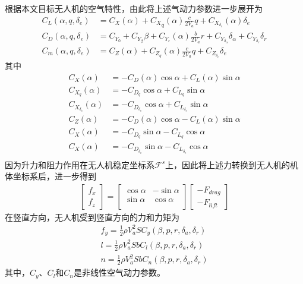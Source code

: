 根据本文目标无人机的空气特性，由此将上述气动力参数进一步展开为
\begin{align}
C_L(\alpha, q, \delta_e) &= C_X(\alpha) + {C_X}_q(\alpha) \frac{c}{2V_a}  q+ C_{X_{{\delta}_e}}(\alpha) \delta_e \\
C_D(\alpha, q, \delta_e) &= C_{Y_{0}} + C_{Y_{\beta}} \beta + C_{Y_r}(\alpha) \frac{b}{2V_a} r+ C_{Y_{\delta_\alpha}} \delta_\alpha +  C_{Y_{\delta_r}} \delta_r  \\ 
C_m(\alpha, q, \delta_e) &= C_Z(\alpha) + C_{Z_q}(\alpha) \frac{c}{2V_a}  q+ C_{Z_{\delta_e}} \delta_e
\end{align}
其中
\begin{align}
C_X(\alpha) &= -C_D(\alpha) \cos \alpha +  C_L(\alpha) \sin \alpha \\
C_{X_q}(\alpha) &= -C_{D_q} \cos \alpha +  C_{L_q} \sin \alpha \\
C_{X_{\delta_e}}(\alpha) &= -C_{D_{\delta_e}} \cos \alpha +  C_{L_{\delta_e}} \sin \alpha \\
C_Z(\alpha) &= -C_D(\alpha) \cos \alpha -  C_L(\alpha) \sin \alpha \\
C_X(\alpha) &= -C_{D_q} \sin \alpha -  C_{L_q} \cos \alpha \\
C_X(\alpha) &= -C_{D_{\delta_e}}  \sin \alpha -  C_{L_{\delta_e}} \cos \alpha \\
\end{align}
因为升力和阻力作用在无人机稳定坐标系$\mathcal{F}^s$上，因此将上述力转换到无人机的机体坐标系后，进一步得到
\begin{align}
\begin{bmatrix} f_x    \\ f_z  \end{bmatrix} = \begin{bmatrix}
\cos \alpha    & - \sin \alpha  \\
\sin \alpha       & \cos \alpha  \\
\end{bmatrix} \begin{bmatrix} -F_{drag}    \\ -F_{lift}  \end{bmatrix}
\end{align}
在竖直方向，无人机受到竖直方向的力和力矩为
\begin{align}
f_y = \frac{1}{2} \rho V_a^2 S C_y (\beta, p, r, \delta_a, \delta_r) \\
l  = \frac{1}{2} \rho V_a^2 S b  C_l (\beta, p, r, \delta_a, \delta_r) \\
n = \frac{1}{2} \rho V_a^2 S b C_n (\beta, p, r, \delta_a, \delta_r)
\end{align}
其中，$C_y$、$C_l$和$C_n$是非线性空气动力参数。

